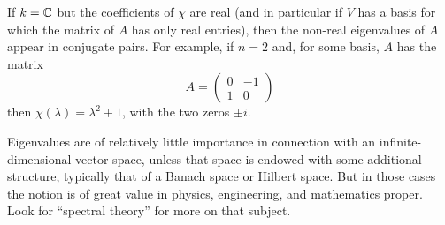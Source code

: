 \documentclass{article}
\begin{document}
If $k=\mathbb{C}$ but the coefficients of $\chi$ are real (and in particular if
$V$ has a basis for which the matrix of $A$ has only real entries), then
the non-real eigenvalues of $A$ appear in conjugate pairs. For example,
if $n=2$ and, for some basis, $A$ has the matrix
$$ A = \begin{pmatrix} 0 & -1 \\ 1 & 0 \end{pmatrix} $$
then $\chi(\lambda)=\lambda^2+1$, with the two zeros $\pm i$.

Eigenvalues are of relatively little importance in connection with
an infinite-dimensional vector space, unless that space is endowed with
some additional structure, typically that of a Banach space or Hilbert space. But in those cases the notion is of great value in
physics, engineering, and mathematics proper. Look for ``spectral theory''
for more on that subject.
\end{document}
